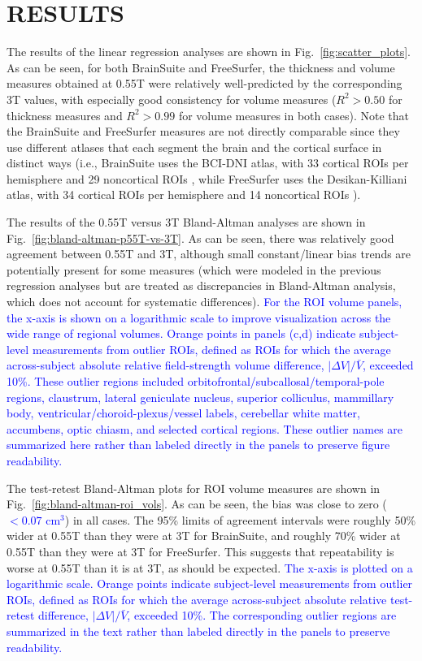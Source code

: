 \documentclass[12pt,letterpaper,onecolumn]{article}
\newcommand{\mycomment}[1]
{\todo[caption={#1},color=red!100!green!33,noline]{\color{black} \begin{spacing}{0.5}#1\vspace{-0.5em}\end{spacing}}}
\begin{document}
\section{RESULTS}
\label{sec:results}
The results of the linear regression analyses are shown in Fig.~\ref{fig:scatter_plots}. As can be seen, for both BrainSuite and FreeSurfer, the thickness and volume measures obtained at 0.55T were { relatively well-predicted} by the corresponding 3T values, with especially good consistency for volume measures ($R^2 > 0.50$ for thickness measures and $R^2>0.99$ for volume measures in both cases).  Note that the BrainSuite and FreeSurfer measures are not directly comparable since they use different atlases that each segment the brain and the cortical surface in distinct ways (i.e., BrainSuite uses the BCI-DNI atlas, with 33 cortical ROIs per hemisphere and 29 noncortical ROIs \cite{joshi_hybrid_2022}, while FreeSurfer  uses the Desikan-Killiani atlas, with 34 cortical ROIs per hemisphere and 14 noncortical ROIs \cite{desikan_automated_2006}). 

The results of the 0.55T versus 3T Bland-Altman analyses are shown in {\color{.}Fig.~\ref{fig:bland-altman-p55T-vs-3T}}. As can be seen, there was relatively good agreement between 0.55T and 3T, although small constant/linear bias trends are potentially present for some measures (which were modeled in the previous regression analyses but are treated as discrepancies in Bland-Altman analysis, which does not account for systematic differences). \textcolor{blue}{For the ROI volume panels, the x-axis is shown on a logarithmic scale to improve visualization across the wide range of regional volumes. Orange points in panels (c,d) indicate subject-level measurements from outlier ROIs, defined as ROIs for which the average across-subject absolute relative field-strength volume difference, $|\Delta V|/\bar{V}$, exceeded 10\%. These outlier regions included orbitofrontal/subcallosal/temporal-pole regions, claustrum, lateral geniculate nucleus, superior colliculus, mammillary body, ventricular/choroid-plexus/vessel labels, cerebellar white matter, accumbens, optic chiasm, and selected cortical regions. These outlier names are summarized here rather than labeled directly in the panels to preserve figure readability.\mycomment{R1.3}}



The test-retest Bland-Altman plots for ROI volume measures are shown in Fig.~\ref{fig:bland-altman-roi_vols}.  As can be seen, the bias was close to zero (\textcolor{blue}{$< 0.07$ cm$^3$\mycomment{R1.3}}) in all cases.    The 95\% limits of agreement intervals were roughly 50\% wider at 0.55T than they were at 3T for BrainSuite, and roughly 70\% wider at 0.55T than they were at 3T for FreeSurfer.  This suggests that repeatability is worse at 0.55T than it is at 3T, as should be expected. \textcolor{blue}{The x-axis is plotted on a logarithmic scale. Orange points indicate subject-level measurements from outlier ROIs, defined as ROIs for which the average across-subject absolute relative test-retest difference, $|\Delta V|/\bar{V}$, exceeded 10\%. The corresponding outlier regions are summarized in the text rather than labeled directly in the panels to preserve readability.\mycomment{R1.3}} 
\end{document}

